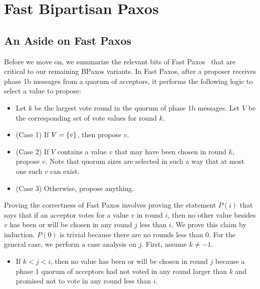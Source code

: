 \documentclass{mwhittaker}
\theoremstyle{definition}
\begin{document}
\section{Fast Bipartisan Paxos}




\begin{appendices}

\section{An Aside on Fast Paxos}
Before we move on, we summarize the relevant bits of Fast
Paxos~\cite{lamport2006fast} that are critical to our remaining BPaxos
variants. In Fast Paxos, after a proposer receives phase 1b messages from a
quorum of acceptors, it performs the following logic to select a value to
propose:
\begin{itemize}
  \item
    Let $k$ be the largest vote round in the quorum of phase 1b messages.
    Let $V$ be the corresponding set of vote values for round $k$.
  \item
    (Case 1) If $V = \{v\}$, then propose $v$.
  \item
    (Case 2) If $V$ contains a value $v$ that may have been chosen in round
    $k$, propose $v$. Note that quorum sizes are selected in such a way that at
    most one such $v$ can exist.
  \item
    (Case 3) Otherwise, propose anything.
\end{itemize}

Proving the correctness of Fast Paxos involves proving the statement $P(i)$
that says that if an acceptor votes for a value $v$ in round $i$, then no
other value besides $v$ has been or will be chosen in any round $j$ less than
$i$. We prove this claim by induction. $P(0)$ is trivial because there are no
rounds less than $0$. For the general case, we perform a case analysis on $j$.
First, assume $k \neq -1$.
\begin{itemize}
  \item
    If $k < j < i$, then no value has been or will be chosen in round $j$
    because a phase 1 quorum of acceptors had not voted in any round larger
    than $k$ and promised not to vote in any round less than $i$.


\end{itemize}
\end{appendices}
\end{document}
